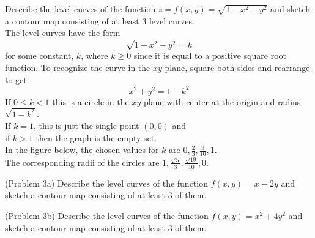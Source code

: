 \documentclass[handout]{ximera}
\begin{document}
\begin{example}[Example 3]
Describe the level curves of the function $z = f(x, y) = \sqrt{1-x^2 - y^2}$ and sketch a contour map consisting of at least 3 level curves.\\
The level curves have the form 
\[
\sqrt{1 - x^2 - y^2} = k
\]
for some constant, $k$, where $k \geq 0$ since it is equal to a positive square root function. To recognize the curve in the $xy$-plane, square both sides and rearrange to get:
\[
x^2 + y^2 = 1- k^2 
\]
If $0 \leq k < 1$ this is a circle in the $xy$-plane with center at the origin and radius $\sqrt{1-k^2}$.\\
If $k = 1$, this is just the single point $(0, 0)$ and \\
if $k>1$ then the graph is the empty set.\\
In the figure below, the chosen values for $k$ are $0, \frac23, \frac{9}{10}, 1$.\\
The corresponding radii of the circles are $1, \frac{\sqrt{5}}{3}, \frac{\sqrt{19}}{10}, 0$.

\begin{image}
\end{image}

\end{example}

\begin{problem}(Problem 3a)
Describe the level curves of the function $f(x,y) = x - 2y$ and sketch a contour map consisting of at least 3 of them.\\
\end{problem}

\begin{problem}(Problem 3b)
Describe the level curves of the function $f(x, y) = x^2 + 4y^2$ and sketch a contour map consisting of at least 3 of them.\\
\end{problem}
\end{document}
